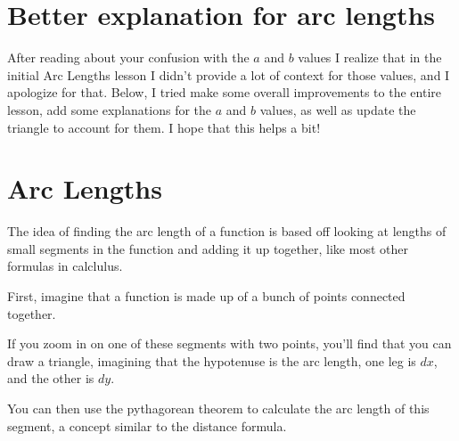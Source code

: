 \documentclass[letterpaper, 12pt]{article}
\begin{document}
\section{Better explanation for arc lengths}
After reading about your confusion with the $a$ and $b$ values I realize that in the initial Arc Lengths lesson I didn't provide a lot of context for those values, and I apologize for that. Below, I tried make some overall improvements to the entire lesson, add some explanations for the $a$ and $b$ values, as well as update the triangle to account for them. I hope that this helps a bit!
\section{Arc Lengths}
The idea of finding the arc length of a function is based off looking at lengths of small segments in the function and adding it up together, like most other formulas in calclulus. \par
First, imagine that a function is made up of a bunch of points connected together.
\begin{center}
\end{center}
If you zoom in on one of these segments with two points, you'll find that you can draw a triangle, imagining that the hypotenuse is the arc length, one leg is $dx$, and the other is $dy$. \par
You can then use the pythagorean theorem to calculate the arc length of this segment, a concept similar to the distance formula.
\end{document}
